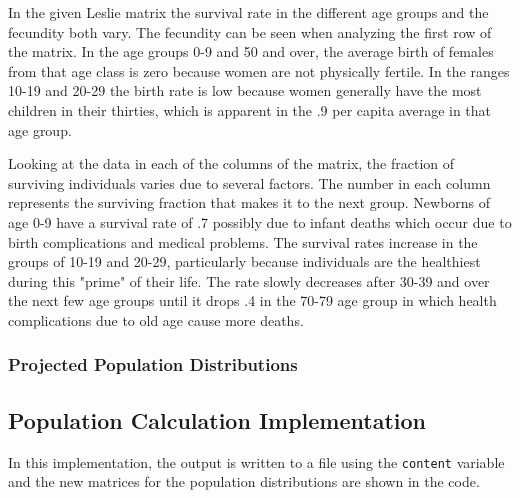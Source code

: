 \documentclass[letterpaper,12pt]{article}
\begin{document}
In the given Leslie matrix the survival rate in the different age groups and the
fecundity both vary.
The fecundity can be seen when analyzing the first row of the matrix.
In the age groups 0-9 and 50 and over, the average birth of females from that
age class is zero because women are not physically fertile.
In the ranges 10-19 and 20-29 the birth rate is low because women generally have
the most children in their thirties, which is apparent in the .9 per capita
average in that age group. 

Looking at the data in each of the columns of the matrix, the fraction of
surviving individuals varies due to several factors.
The number in each column represents the surviving fraction that makes it to the
next group.
Newborns of age 0-9 have a survival rate of .7 possibly due to infant deaths which
occur due to birth complications and medical problems.
The survival rates increase in the groups of 10-19 and 20-29, particularly
because individuals are the healthiest during this "prime" of their life.
The rate slowly decreases after 30-39 and over the next few age groups until it
drops .4 in the 70-79 age group in which health complications due to old age
cause more deaths.

\subsubsection{Projected Population Distributions}

\subsection{Population Calculation Implementation}
In this implementation, the output is written to a file using the
\texttt{content} variable and the new matrices for the population distributions
are shown in the code.
\end{document}
